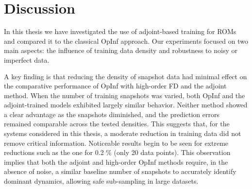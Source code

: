 
\chapter{Discussion}
\label{chap:discussion}
\vspace{-1.3cm}

In this thesis we have investigated the use of adjoint-based training for ROMs and compared it to the classical OpInf approach. Our experiments focused on two main aspects: the influence of training data density and robustness to noisy or imperfect data.

A key finding is that reducing the density of snapshot data had minimal effect on the comparative performance of OpInf with high-order FD and the adjoint method. When the number of training snapshots was varied, both OpInf and the adjoint-trained models exhibited largely similar behavior. Neither method showed a clear advantage as the snapshots diminished, and the prediction errors remained comparable across the tested densities. This suggests that, for the systems considered in this thesis, a moderate reduction in training data did not remove critical information. Noticeable results begin to be seen for extreme reductions such as the one for 0.2 \% (only 20 data points). This observation implies that both the adjoint and high-order OpInf methods require, in the absence of noise, a similar baseline number of snapshots to accurately identify dominant dynamics, allowing safe sub-sampling in large datasets.


